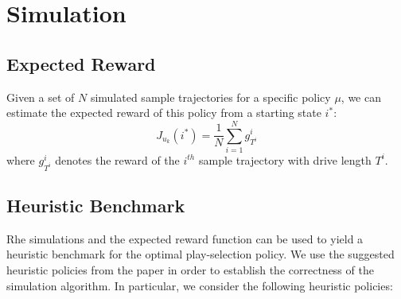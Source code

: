 \documentclass[11pt, oneside]{article}   	%
\begin{document}
\section{Simulation}

\subsection{Expected Reward}
Given a set of $N$ simulated sample trajectories for a specific policy $\mu$, we can estimate the expected reward of this policy from a starting state $i^*$:
$$
J_{u_k}(i^*) = \frac{1}{N}\sum_{i=1}^N g_{T^i}^i
$$
where $g_{T^i}^i$ denotes the reward of the $i^{th}$ sample trajectory with drive length $T^i$.

\subsection{Heuristic Benchmark}
Rhe simulations and the expected reward function can be used to yield a heuristic benchmark for the optimal play-selection policy. We use the suggested heuristic policies from the paper in order to establish the correctness of the simulation algorithm. In particular, we consider the following heuristic policies:
\end{document}
